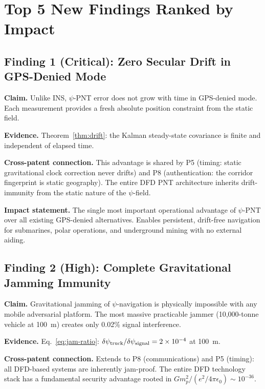 \documentclass[aps,prd,twocolumn,superscriptaddress,nofootinbib]{revtex4-2}
\begin{document}
\section{Top 5 New Findings Ranked by Impact}
\label{sec:findings}

\subsection*{Finding 1 (Critical): Zero Secular Drift in GPS-Denied Mode}

\textbf{Claim.} Unlike INS, $\psi$-PNT error does not grow with time
in GPS-denied mode.  Each measurement provides a fresh absolute
position constraint from the static field.

\textbf{Evidence.} Theorem~\ref{thm:drift}: the Kalman steady-state
covariance is finite and independent of elapsed time.

\textbf{Cross-patent connection.} This advantage is shared by P5
(timing: static gravitational clock correction never drifts) and P8
(authentication: the corridor fingerprint is static geography).  The
entire DFD PNT architecture inherits drift-immunity from the static
nature of the $\psi$-field.

\textbf{Impact statement.} The single most important operational
advantage of $\psi$-PNT over all existing GPS-denied alternatives.
Enables persistent, drift-free navigation for submarines, polar
operations, and underground mining with no external aiding.

\subsection*{Finding 2 (High): Complete Gravitational Jamming Immunity}

\textbf{Claim.} Gravitational jamming of $\psi$-navigation is
physically impossible with any mobile adversarial platform.  The
most massive practicable jammer (10,000-tonne vehicle at 100~m)
creates only 0.02\% signal interference.

\textbf{Evidence.} Eq.~\eqref{eq:jam-ratio}: $\delta\psi_{\rm truck}/
\delta\psi_{\rm signal} = 2\times10^{-4}$ at 100~m.

\textbf{Cross-patent connection.} Extends to P8 (communications) and
P5 (timing): all DFD-based systems are inherently jam-proof.  The
entire DFD technology stack has a fundamental security advantage
rooted in $G m_p^2/(e^2/4\pi\epsilon_0) \sim 10^{-36}$.
\end{document}
